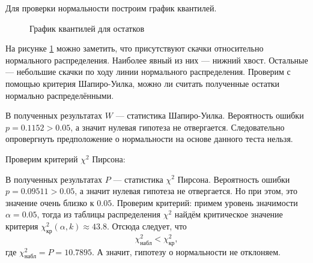 Для проверки нормальности построим график квантилей.
\begin{figure}[ht]
\caption{График квантилей для остатков}
\label{img:resid_qqnorm}
\end{figure}
На рисунке \ref{img:resid_qqnorm} можно заметить, что присутствуют скачки относительно нормального распределения. Наиболее явный из них --- нижний хвост. Остальные --- небольшие скачки по ходу линии нормального распределения. Проверим с помощью критерия Шапиро-Уилка, можно ли считать полученные остатки нормально распределёнными.

В полученных результатах $W$ --- статистика Шапиро-Уилка. Вероятность ошибки $p = 0.1152 > 0.05$, а значит нулевая гипотеза не отвергается. Следовательно опровергнуть предположение о нормальности на основе данного теста нельзя.

\bigskip
\bigskip
Проверим критерий $\chi^2$ Пирсона:
\bigskip

В полученных результатах $P$ --- статистика $\chi^2$ Пирсона. Вероятность ошибки $p = 0.09511 > 0.05$, а значит нулевая гипотеза не отвергается. Но при этом, это значение очень близко к $0.05$. Проверим критерий: примем уровень значимости $\alpha = 0.05$, тогда из таблицы распределения $\chi^2$ найдём критическое значение критерия $\chi_{\textrm{кр}}^2(\alpha, k) \approx 43.8$. Отсюда следует, что
\begin{equation*}
	\chi_{\textrm{набл}}^2 < \chi_{\textrm{кр}}^2,
\end{equation*}
где $\chi_{\textrm{набл}}^2 = P = 10.7895$. А значит, гипотезу о нормальности не отклоняем. 

